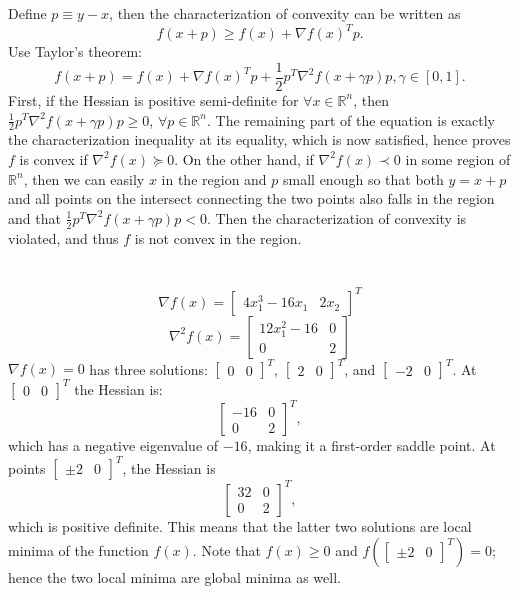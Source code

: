 \documentclass[11pt]{article}
\begin{document}
\section{}
Define $p\equiv y-x$, then the characterization of convexity can be written as $$f(x+p)\geq f(x)+\nabla f(x)^Tp.$$ Use Taylor's theorem: $$f(x+p)=f(x)+\nabla f(x)^Tp+\frac12p^T\nabla ^2f(x+\gamma p)p, \gamma\in[0,1].$$ First, if the Hessian is positive semi-definite for $\forall x\in\mathbb{R}^n$, then $\frac12p^T\nabla^2f(x+\gamma p)p\geq0$, $\forall p\in \mathbb{R}^n$. The remaining part of the equation is exactly the characterization inequality at its equality, which is now satisfied, hence proves $f$ is convex if $\nabla^2f(x)\succeq0$. On the other hand, if $\nabla^2f(x)\prec0$ in some region of $\mathbb{R}^n$, then we can easily $x$ in the region and $p$ small enough so that both $y=x+p$ and all points on the intersect connecting the two points also falls in the region and that $\frac12p^T\nabla^2f(x+\gamma p)p< 0$. Then the characterization of convexity is violated, and thus $f$ is not convex in the region.   
\section{}
\subsection{}
$$\nabla f(x)=\begin{bmatrix}4x_1^3-16x_1 & 2x_2\end{bmatrix}^T$$
$$\nabla^2 f(x)=\begin{bmatrix}12x_1^2-16&0\\0&2\end{bmatrix}$$
$\nabla f(x)=0$ has three solutions: $\begin{bmatrix}0&0\end{bmatrix}^T$, $\begin{bmatrix}2&0\end{bmatrix}^T$, and $\begin{bmatrix}-2&0\end{bmatrix}^T$. At $\begin{bmatrix}0&0\end{bmatrix}^T$ the Hessian is:$$\begin{bmatrix}-16&0\\0&2\end{bmatrix}^T,$$ which has a negative eigenvalue of $-16$, making it a first-order saddle point. At points $\begin{bmatrix}\pm2&0\end{bmatrix}^T$, the Hessian is $$\begin{bmatrix}32&0\\0&2\end{bmatrix}^T,$$ which is positive definite. This means that the latter two solutions are local minima of the function $f(x)$. Note that $f(x)\geq0$ and $f(\begin{bmatrix}\pm2&0\end{bmatrix}^T)=0$; hence the two local minima are global minima as well.
\end{document}
